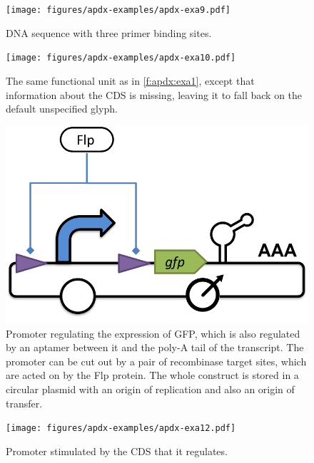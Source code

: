 \begin{figure}[h!]
\texttt{[image: figures/apdx-examples/apdx-exa9.pdf]}
\caption{DNA sequence with three primer binding sites.}
\label{f:apdx:exa9}
\end{figure}

\begin{figure}[h!]
\texttt{[image: figures/apdx-examples/apdx-exa10.pdf]}
\caption{The same functional unit as in \ref{f:apdx:exa1}, except that information about the CDS is missing, leaving it to fall back on the default unspecified glyph.}
\label{f:apdx:exa10}
\end{figure}

\begin{figure}[h!]
\includegraphics[scale=0.5]{figures/apdx-examples/apdx-exa11.pdf}
\caption{Promoter regulating the expression of GFP, which is also regulated by an aptamer between it and the poly-A tail of the transcript. The promoter can be cut out by a pair of recombinase target sites, which are acted on by the Flp protein.  The whole construct is stored in a circular plasmid with an origin of replication and also an origin of transfer.}
\label{f:apdx:exa11}
\end{figure}

\begin{figure}[h!]
\texttt{[image: figures/apdx-examples/apdx-exa12.pdf]}
\caption{Promoter stimulated by the CDS that it regulates.}
\label{f:apdx:exa12}
\end{figure}

